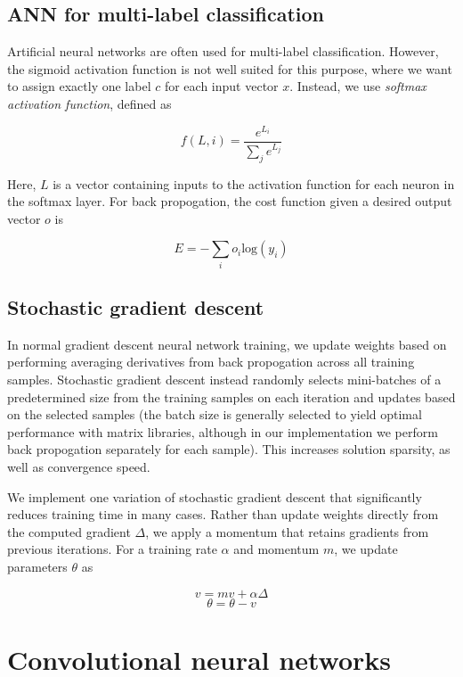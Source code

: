 \documentclass[10pt,twocolumn]{article}
\begin{document}
\subsection{ANN for multi-label classification}

Artificial neural networks are often used for multi-label classification. However, the sigmoid activation function is not well suited for this purpose, where we want to assign exactly one label $c$ for each input vector $x$. Instead, we use \emph{softmax activation function}, defined as

$$f(L, i) = \frac{e^{L_i}}{\sum_j e^{L_j}}$$

Here, $L$ is a vector containing inputs to the activation function for each neuron in the softmax layer. For back propogation, the cost function given a desired output vector $o$ is

$$E = -\sum_i o_i \text{log}(y_i)$$


\subsection{Stochastic gradient descent}

In normal gradient descent neural network training, we update weights based on performing averaging derivatives from back propogation across all training samples. Stochastic gradient descent instead randomly selects mini-batches of a predetermined size from the training samples on each iteration and updates based on the selected samples (the batch size is generally selected to yield optimal performance with matrix libraries, although in our implementation we perform back propogation separately for each sample). This increases solution sparsity, as well as convergence speed.

We implement one variation of stochastic gradient descent that significantly reduces training time in many cases. Rather than update weights directly from the computed gradient $\Delta$, we apply a momentum that retains gradients from previous iterations. For a training rate $\alpha$ and momentum $m$, we update parameters $\theta$ as


$$v = mv + \alpha \Delta$$
$$\theta = \theta - v$$

\section{Convolutional neural networks} \label{sec:cnn}
\end{document}
